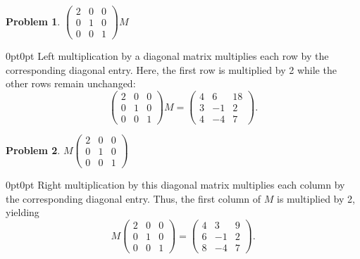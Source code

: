 \documentclass[12pt]{article}
\newenvironment{answer}
    {\begin{adjustwidth}{0pt}{0pt}}
    {\end{adjustwidth}}
\newtheorem{problem}{Problem}
\theoremstyle{remark}  %
\begin{document}
\begin{problem}
$
\begin{pmatrix}
2 & 0 & 0 \\
0 & 1 & 0 \\
0 & 0 & 1
\end{pmatrix} M
$
\end{problem}
\begin{answer}
Left multiplication by a diagonal matrix multiplies each row by the corresponding diagonal entry. Here, the first row is multiplied by 2 while the other rows remain unchanged:
\[
\begin{pmatrix}
2 & 0 & 0 \\
0 & 1 & 0 \\
0 & 0 & 1
\end{pmatrix} M
=
\begin{pmatrix}
4 & 6 & 18 \\
3 & -1 & 2 \\
4 & -4 & 7
\end{pmatrix}.
\]
\end{answer}

\begin{problem}
$
M
\begin{pmatrix}
2 & 0 & 0 \\
0 & 1 & 0 \\
0 & 0 & 1
\end{pmatrix}
$
\end{problem}
\begin{answer}
Right multiplication by this diagonal matrix multiplies each column by the corresponding diagonal entry. Thus, the first column of \(M\) is multiplied by 2, yielding
\[
M \begin{pmatrix}
2 & 0 & 0 \\
0 & 1 & 0 \\
0 & 0 & 1
\end{pmatrix}
=
\begin{pmatrix}
4 & 3 & 9 \\
6 & -1 & 2 \\
8 & -4 & 7
\end{pmatrix}.
\]
\end{answer}
\end{document}
